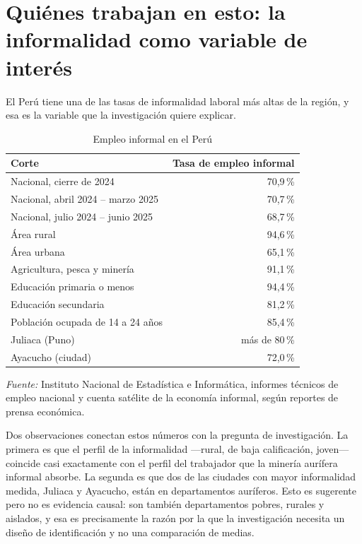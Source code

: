 \documentclass[11pt,a4paper]{article}
\begin{document}
\section{Quiénes trabajan en esto: la informalidad como variable de interés}

El Perú tiene una de las tasas de informalidad laboral más altas de la región, y esa es la variable que la investigación quiere explicar.

\begin{table}[h!]
\centering
\singlespacing
\caption{Empleo informal en el Perú}
\label{tab:informalidad}
\small
\begin{tabularx}{\textwidth}{X r}
\toprule
\textbf{Corte} & \textbf{Tasa de empleo informal} \\
\midrule
Nacional, cierre de 2024 & 70{,}9\,\% \\
Nacional, abril 2024 -- marzo 2025 & 70{,}7\,\% \\
Nacional, julio 2024 -- junio 2025 & 68{,}7\,\% \\
\addlinespace
Área rural & 94{,}6\,\% \\
Área urbana & 65{,}1\,\% \\
\addlinespace
Agricultura, pesca y minería & 91{,}1\,\% \\
\addlinespace
Educación primaria o menos & 94{,}4\,\% \\
Educación secundaria & 81{,}2\,\% \\
Población ocupada de 14 a 24 años & 85{,}4\,\% \\
\addlinespace
Juliaca (Puno) & más de 80\,\% \\
Ayacucho (ciudad) & 72{,}0\,\% \\
\bottomrule
\end{tabularx}

\vspace{0.4em}
\begin{minipage}{0.92\textwidth}
\footnotesize \textit{Fuente:} Instituto Nacional de Estadística e Informática, informes técnicos de empleo nacional y cuenta satélite de la economía informal, según reportes de prensa económica.
\end{minipage}
\end{table}

Dos observaciones conectan estos números con la pregunta de investigación. La primera es que el perfil de la informalidad ---rural, de baja calificación, joven--- coincide casi exactamente con el perfil del trabajador que la minería aurífera informal absorbe. La segunda es que dos de las ciudades con mayor informalidad medida, Juliaca y Ayacucho, están en departamentos auríferos. Esto es sugerente pero no es evidencia causal: son también departamentos pobres, rurales y aislados, y esa es precisamente la razón por la que la investigación necesita un diseño de identificación y no una comparación de medias.
\end{document}
